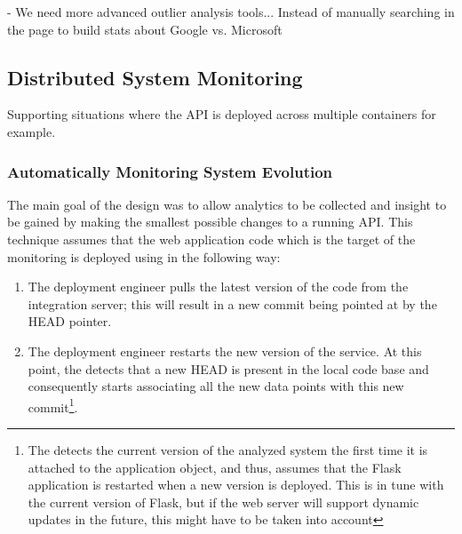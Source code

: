 - We need more advanced outlier analysis tools... Instead of manually searching in the page to build stats about Google vs. Microsoft





  \subsection{Distributed System Monitoring}
  Supporting situations where the API is deployed across multiple containers for example.


  \subsubsection{Automatically Monitoring System Evolution}

  The main goal of the \tool design was to allow analytics to be collected and insight to be gained by making the smallest possible changes to a running API. %
%
  This technique assumes that the web application code which is the target of the monitoring is deployed using \git in the following way: 

  \begin{enumerate}
    \item The deployment engineer pulls the latest version of the code from the integration server; this will result in a new commit being pointed at by the HEAD pointer. %
    \item The deployment engineer restarts the new version of the service. At this point, the \tool detects that a new HEAD is present in the local code base and consequently starts associating all the new data points with this new commit\footnote{The \tool detects the current version of the analyzed system the first time it is attached to the application object, and thus, assumes that the Flask application is restarted when a new version is deployed. This is in tune with the current version of Flask, but if the web server will support dynamic updates in the future, this might have to be taken into account}.
  \end{enumerate}

